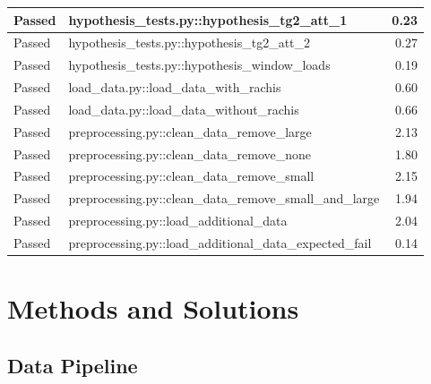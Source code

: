 \documentclass[11pt]{report}
\begin{document}
\begin{table}[htb]
\begin{tabularx}{\textwidth}{|l|X|r|}
\hline
\color{ForestGreen}Passed & hypothesis\_tests.py::hypothesis\_tg2\_att\_1 & 0.23\\
\hline
\color{ForestGreen}Passed & hypothesis\_tests.py::hypothesis\_tg2\_att\_2 & 0.27\\
\hline
\color{ForestGreen}Passed & hypothesis\_tests.py::hypothesis\_window\_loads & 0.19\\
\hline
\color{ForestGreen}Passed & load\_data.py::load\_data\_with\_rachis & 0.60\\
\hline
\color{ForestGreen}Passed & load\_data.py::load\_data\_without\_rachis & 0.66\\
\hline
\color{ForestGreen}Passed & preprocessing.py::clean\_data\_remove\_large & 2.13\\
\hline
\color{ForestGreen}Passed & preprocessing.py::clean\_data\_remove\_none & 1.80\\
\hline
\color{ForestGreen}Passed & preprocessing.py::clean\_data\_remove\_small & 2.15\\
\hline
\color{ForestGreen}Passed & preprocessing.py::clean\_data\_remove\_small\_and\_large & 1.94\\
\hline
\color{ForestGreen}Passed & preprocessing.py::load\_additional\_data & 2.04\\
\hline
\color{ForestGreen}Passed & preprocessing.py::load\_additional\_data\_expected\_fail & 0.14\\
\hline
\end{tabularx}
\end{table}




\chapter{Methods and Solutions}
\label{sec-3}
\section{Data Pipeline}
\label{sec-3-1}
\end{document}
